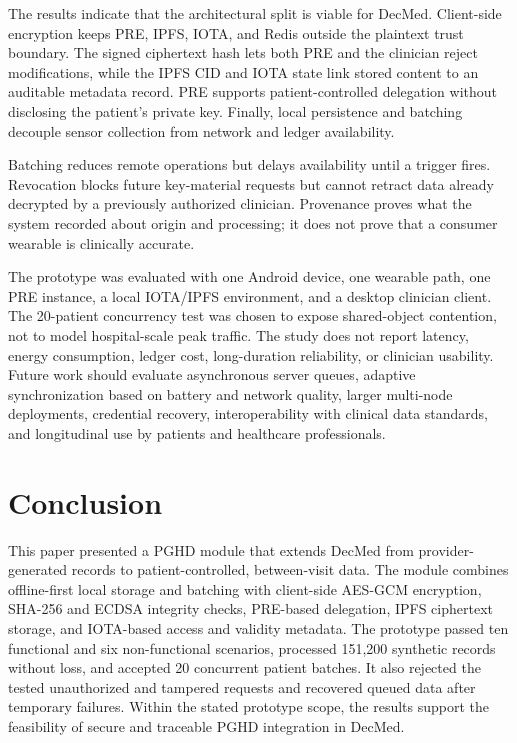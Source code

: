 The results indicate that the architectural split is viable for DecMed.
Client-side encryption keeps PRE, IPFS, IOTA, and Redis outside the plaintext trust boundary.
The signed ciphertext hash lets both PRE and the clinician reject modifications, while the IPFS CID and IOTA state link stored content to an auditable metadata record.
PRE supports patient-controlled delegation without disclosing the patient's private key.
Finally, local persistence and batching decouple sensor collection from network and ledger availability.

Batching reduces remote operations but delays availability until a trigger fires.
Revocation blocks future key-material requests but cannot retract data already decrypted by a previously authorized clinician.
Provenance proves what the system recorded about origin and processing; it does not prove that a consumer wearable is clinically accurate.

The prototype was evaluated with one Android device, one wearable path, one PRE instance, a local IOTA/IPFS environment, and a desktop clinician client.
The 20-patient concurrency test was chosen to expose shared-object contention, not to model hospital-scale peak traffic.
The study does not report latency, energy consumption, ledger cost, long-duration reliability, or clinician usability.
Future work should evaluate asynchronous server queues, adaptive synchronization based on battery and network quality, larger multi-node deployments, credential recovery, interoperability with clinical data standards, and longitudinal use by patients and healthcare professionals.

\section{Conclusion}

This paper presented a PGHD module that extends DecMed from provider-generated records to patient-controlled, between-visit data.
The module combines offline-first local storage and batching with client-side AES-GCM encryption, SHA-256 and ECDSA integrity checks, PRE-based delegation, IPFS ciphertext storage, and IOTA-based access and validity metadata.
The prototype passed ten functional and six non-functional scenarios, processed 151,200 synthetic records without loss, and accepted 20 concurrent patient batches.
It also rejected the tested unauthorized and tampered requests and recovered queued data after temporary failures.
Within the stated prototype scope, the results support the feasibility of secure and traceable PGHD integration in DecMed.
